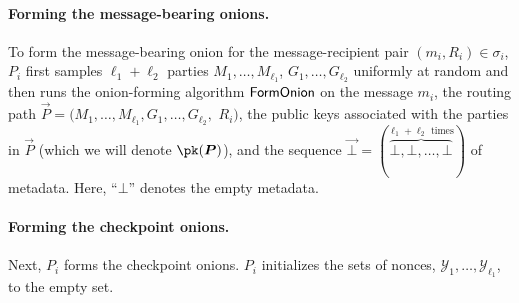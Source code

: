 \documentclass[runningheads,a4paper]{llncs}
\begin{document}
\paragraph{Forming the message-bearing onions.}
To form the message-bearing onion for the message-recipient pair $(m_i, R_i) \in \sigma_i$, $P_i$ first samples $\ell_1+ \ell_2$ parties $M_1, \dots, M_{\ell_1}$, $G_1, \dots, G_{\ell_2}$ uniformly at random and then runs the onion-forming algorithm $\mathsf{FormOnion}$ on  
    the message $m_i$, 
    the routing path $\vec{P} = (M_1, \dots, M_{\ell_1}, G_1, \dots, G_{\ell_2},$ $ R_i)$, 
    the public keys associated with the parties in $\vec{P}$ (which we will denote $\pk(\vec{P})$), and 
    the sequence $\vec{\bot}= (\overbrace{\bot, \bot, \dots, \bot}^{\ell_1 + \ell_2 \text{ times}})$ of metadata.
Here, ``$\bot$'' denotes the empty metadata. %

\iffalse
\begin{figure} [ht!]
\begin{pchstack} [center, boxed]
\pseudocode[linenumbering]{
M_1, \dots, M_{\ell_1}, G_1, \dots, G_{\ell_2} \sample \parties \\
\vec{\bot} = (\overbrace{\bot, \bot, \dots, \bot}^{\ell_1 + \ell_2\text{ times}}) \\
\vec{O} \gets \formonion(m, (M_1, \dots, M_{\ell_1}, G_1, \dots, G_{\ell_2}, R_i), \pk(\vec{P}), \vec{\bot})
}
\end{pchstack}
\caption{\footnotesize{Pseudocode for forming the message-bearing onion}}
\label{fig:mbo}
\end{figure}
\fi

\paragraph{Forming the checkpoint onions.} 
Next, $P_i$ forms the checkpoint onions. 
$P_i$ initializes the sets of nonces, $\mathcal{Y}_1, \dots, \mathcal{Y}_{\ell_1}$, to the empty set. 
\end{document}
